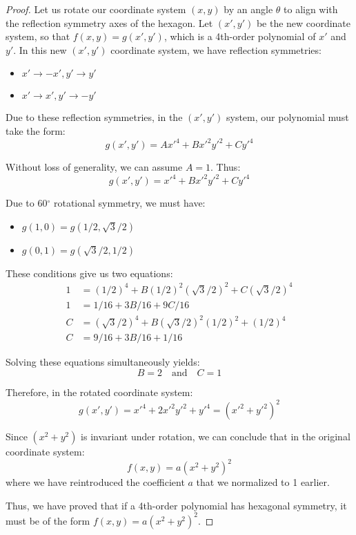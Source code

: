 \documentclass{article}
\begin{document}
\begin{proof} 
Let us rotate our coordinate system $(x, y)$ by an angle $\theta$ to align with the reflection symmetry axes of the hexagon. Let $(x', y')$ be the new coordinate system, so that $f(x, y) = g(x', y')$, which is a 4th-order polynomial of $x'$ and $y'$.  In this new $(x', y')$ coordinate system, we have reflection symmetries:
\begin{itemize}
    \item $x' \to -x', y' \to y'$
    \item $x' \to x', y' \to -y'$
\end{itemize}

Due to these reflection symmetries, in the $(x', y')$ system, our polynomial must take the form:
\begin{equation}
    g(x', y') = Ax'^4 + Bx'^2y'^2 + Cy'^4
\end{equation}

Without loss of generality, we can assume $A = 1$. Thus:
\begin{equation}
g(x', y') = x'^4 + Bx'^2y'^2 + Cy'^4
\end{equation}

Due to 60$^\circ$ rotational symmetry, we must have:
\begin{itemize}
    \item $g(1, 0) = g(1/2, \sqrt{3}/2)$
    \item $g(0, 1) = g(\sqrt{3}/2, 1/2)$
\end{itemize}

These conditions give us two equations:
\begin{equation}
\begin{split}
    1 &= (1/2)^4 + B(1/2)^2(\sqrt{3}/2)^2 + C(\sqrt{3}/2)^4 \\
    1 &= 1/16 + 3B/16 + 9C/16 \\[1em]
    C &= (\sqrt{3}/2)^4 + B(\sqrt{3}/2)^2(1/2)^2 + (1/2)^4 \\
    C &= 9/16 + 3B/16 + 1/16
\end{split}
\end{equation}

Solving these equations simultaneously yields:
\begin{equation}
B = 2 \quad \text{and} \quad C = 1
\end{equation}

Therefore, in the rotated coordinate system:
\begin{equation}
g(x', y') = x'^4 + 2x'^2y'^2 + y'^4 = (x'^2 + y'^2)^2
\end{equation}

Since $(x^2 + y^2)$ is invariant under rotation, we can conclude that in the original coordinate system:
\begin{equation}
f(x, y) = a(x^2 + y^2)^2
\end{equation}
where we have reintroduced the coefficient $a$ that we normalized to 1 earlier.

Thus, we have proved that if a 4th-order polynomial has hexagonal symmetry, it must be of the form $f(x, y) = a(x^2 + y^2)^2$.

\end{proof}
\end{document}
